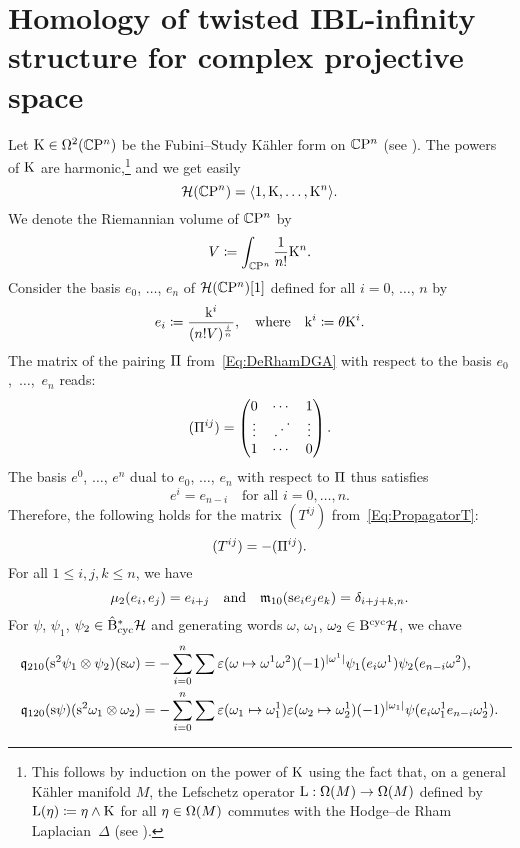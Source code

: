 \documentclass[\MainFolder/Text.tex]{subfiles}
\begin{document}
\section{Homology of twisted IBL-infinity structure for complex projective space}
\label{Section:CPn1}
Let $\mathrm{K}\in \Omega^2(\mathbb{C}\mathrm{P}^n)$ be the Fubini--Study K\"ahler form on $\mathbb{C}\mathrm{P}^n$ (see \cite[Examples 3.1.9]{Huybrechts2004}). The powers of $\mathrm{K}$ are harmonic,\footnote{This follows by induction on the power of $\mathrm{K}$ using the fact that, on a general K\"ahler manifold $M$, the Lefschetz operator $\operatorname{L}: \Omega(M)\rightarrow \Omega(M)$ defined by $\operatorname{L}(\eta)\coloneqq \eta \wedge \mathrm{K}$ for all $\eta\in \Omega(M)$ commutes with the Hodge--de Rham Laplacian~$\Delta$ (see \cite[Chapter 3]{Huybrechts2004}). } and we get easily
$$ \mathcal{H}(\mathbb{C}\mathrm{P}^n) = \langle 1,\mathrm{K}, \dotsc, \mathrm{K}^n \rangle. $$
We denote the Riemannian volume of $\mathbb{C}\mathrm{P}^n$ by
$$ V\coloneqq \int_{\mathbb{C}\mathrm{P}^n} \frac{1}{n!}\mathrm{K}^n. $$
Consider the basis $e_0$, $\dotsc$, $e_n$ of $\mathcal{H}(\mathbb{C}\mathrm{P}^n)[1]$ defined for all $i=0$, $\dotsc$, $n$ by
$$ e_i\coloneqq \frac{\mathrm{k}^i}{(n! V)^{\frac{i}{n}}}, \quad \text{where}\quad\mathrm{k}^i\coloneqq \theta \mathrm{K}^i. $$
The matrix of the pairing $\Pi$ from~\eqref{Eq:DeRhamDGA} with respect to the basis $e_0$,~$\dotsc$,~$e_{n}$ reads:
$$ (\Pi^{ij}) = \begin{pmatrix}
0 & \dotsb & 1 \\
\vdots & {\displaystyle\, .^{{\displaystyle \, .^{\displaystyle\,.}}}} & \vdots \\
1 & \dotsb & 0
\end{pmatrix}. $$
The basis $e^0$, $\dotsc$, $e^n$ dual to $e_0$, $\dotsc$, $e_n$ with respect to $\Pi$ thus satisfies
$$ e^i = e_{n-i}\quad\text{for all }i=0,\dotsc,n. $$
Therefore, the following holds for the matrix $(T^{ij})$ from~\eqref{Eq:PropagatorT}:
\begin{equation*}
(T^{ij}) = - (\Pi^{ij}).
\end{equation*}
For all $1\le i, j, k \le n$, we have
$$ \mu_2(e_i, e_j) = e_{i+j}\quad \text{and}\quad
\mathfrak{m}_{10}(\mathrm{s} e_{i}e_j e_k) = \delta_{i+j+k,n}. $$
For $\psi$, $\psi_1$, $\psi_2 \in \hat{\mathrm{B}}_{\mathrm{cyc}}^* \mathcal{H}$ and generating words $\omega$, $\omega_1$, $\omega_2 \in \mathrm{B}^{\mathrm{cyc}}\mathcal{H}$, we chave
\begin{equation*}
\begin{aligned}
\mathfrak{q}_{210}(\mathrm{s}^2 \psi_1 \otimes \psi_2)(\mathrm{s} \omega) &= -\sum_{i=0}^n \sum \varepsilon(\omega\mapsto \omega^1\omega^2)(-1)^{|\omega^1|} \psi_1(e_i \omega^1)\psi_2(e_{n-i}\omega^2), \\
\mathfrak{q}_{120}(\mathrm{s} \psi)(\mathrm{s}^2 \omega_1 \otimes \omega_2) & = - \sum_{i=0}^n \sum \varepsilon(\omega_1 \mapsto \omega_1^1)\varepsilon(\omega_2\mapsto \omega_2^1) (-1)^{|\omega_1|} \psi(e_i \omega_1^1 e_{n-i} \omega_2^1).
\end{aligned}
\end{equation*}
\end{document}
